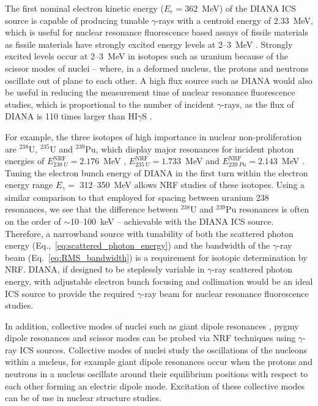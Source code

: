 \documentclass[../main.tex]{subfiles}
\begin{document}
The first nominal electron kinetic energy ($E_{e} = 362$~\si{\mega\electronvolt}) of the DIANA ICS source is capable of producing tunable $\gamma$-rays with a centroid energy of 2.33~\si{\mega\electronvolt}, which is useful for nuclear resonance fluorescence based assays of fissile materials as fissile materials have strongly excited energy levels at 2--3~\si{\mega\electronvolt} \cite{angell2015demonstration}. Strongly excited levels occur at 2--3~\si{\mega\electronvolt} in isotopes such as uranium because of the scissor modes of nuclei \cite{iudice1978new,bohle1984new} -- where, in a deformed nucleus, the protons and neutrons oscillate out of plane to each other. A high flux source such as DIANA would also be useful in reducing the measurement time of nuclear resonance fluorescence studies, which is proportional to the number of incident $\gamma$-rays, as the flux of DIANA is 110 times larger than HI$\gamma$S \cite{weller2009research}.

For example, the three isotopes of high importance in nuclear non-proliferation are $^{238}\mathrm{U}$, $^{235}\mathrm{U}$ and $^{239}\mathrm{Pu}$, which display major resonances for incident photon energies of $E_{238~U}^{\mathrm{NRF}} = 2.176$~\si{\mega\electronvolt} \cite{quiter2011transmission},  $E_{235~U}^{\mathrm{NRF}} = 1.733$~\si{\mega\electronvolt} and  $E_{239~Pu}^{\mathrm{NRF}} = 2.143$~\si{\mega\electronvolt} \cite{hayakawa2010nondestructive}. Tuning the electron bunch energy of DIANA in the first turn within the electron energy range $E_{\gamma} =$ 312--350~\si{\mega\electronvolt} allows NRF studies of these isotopes. Using a similar comparison to that employed for spacing between uranium 238 resonances, we see that the difference between $^{238}\mathrm{U}$ \cite{quiter2011transmission} and $^{239}\mathrm{Pu}$ \cite{hayakawa2010nondestructive} resonances is often on the order of $\sim$10--100~\si{\kilo\electronvolt} -- achievable with the DIANA ICS source. Therefore, a narrowband source with tunability of both the scattered photon energy (Eq.,~\ref{eq:scattered_photon_energy}) and the bandwidth of the $\gamma$-ray beam (Eq.~\ref{eq:RMS_bandwidth}) is a requirement for isotopic determination by NRF. DIANA, if designed to be steplessly variable in $\gamma$-ray scattered photon energy, with adjustable electron bunch focusing and collimation would be an ideal ICS source to provide the required $\gamma$-ray beam for nuclear resonance fluorescence studies.  

In addition, collective modes of nuclei such as giant dipole resonances \cite{goldhaber1948nuclear,baldwin1947photo}, pygmy dipole resonances \cite{cook1957photodisintegration,tonchev2010spectral} and scissor modes \cite{iudice1978new,de1984reformulation,bohle1984new} can be probed via NRF techniques using $\gamma$-ray ICS sources. Collective modes of nuclei study the oscillations of the nucleons within a nucleus, for example giant dipole resonances occur when the protons and neutrons in a nucleus oscillate around their equilibrium positions with respect to each other forming an electric dipole mode. Excitation of these collective modes can be of use in nuclear structure studies.
\end{document}
